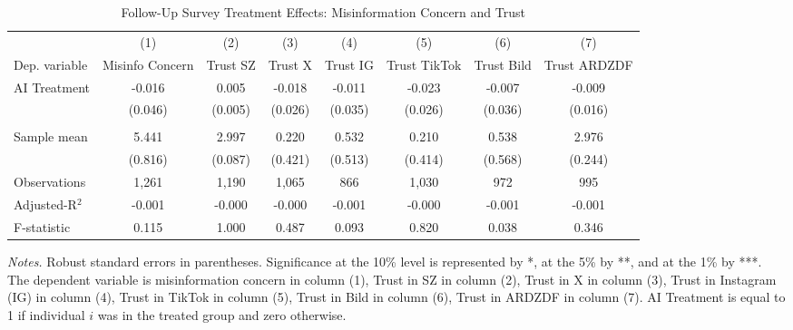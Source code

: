  \begin{table}[H]
 \centering 
 \caption{Follow-Up Survey Treatment Effects: Misinformation Concern and Trust} 
 \label{tab:trust_followup} 
 \begin{adjustbox}{max width=\textwidth} 
\begin{tabular}{lccccccc} 
 \toprule
& (1) & (2) & (3) & (4) & (5) & (6) & (7)  \\
 Dep. variable & Misinfo Concern & Trust SZ & Trust X & Trust IG & Trust TikTok & Trust Bild & Trust ARDZDF \\ 
 \midrule 
AI Treatment    &   -0.016   &    0.005   &   -0.018   &   -0.011   &   -0.023   &   -0.007   &   -0.009   \\
                &  (0.046)   &  (0.005)   &  (0.026)   &  (0.035)   &  (0.026)   &  (0.036)   &  (0.016)   \\
& & & & & & &  \\
Sample mean&      5.441 &      2.997 &      0.220 &      0.532 &      0.210 &      0.538 &      2.976  \\
& (0.816) & (0.087) & (0.421) & (0.513) & (0.414) & (0.568) & (0.244)  \\
 \midrule
Observations &      1,261 &      1,190 &      1,065 &        866 &      1,030 &        972 &        995  \\
Adjusted-R$^2$ &     -0.001 &     -0.000 &     -0.000 &     -0.001 &     -0.000 &     -0.001 &     -0.001  \\
F-statistic &      0.115 &      1.000 &      0.487 &      0.093 &      0.820 &      0.038 &      0.346  \\
 \bottomrule
 \end{tabular}
 \end{adjustbox}
 \par
 \begin{minipage}{1\linewidth}
 \baselineskip9pt {\scriptsize \vspace{0.1cm} { \it Notes.} Robust standard errors in parentheses. Significance at the 10\% level is represented by *, at the 5\% by **, and at the 1\% by ***. The dependent variable is misinformation concern in column (1), Trust in SZ in column (2), Trust in X in column (3), Trust in Instagram (IG) in column (4), Trust in TikTok in column (5), Trust in Bild in column (6), Trust in ARDZDF in column (7). AI Treatment is equal to 1 if individual $i$ was in the treated group and zero otherwise.}
 \end{minipage}
 \end{table}
